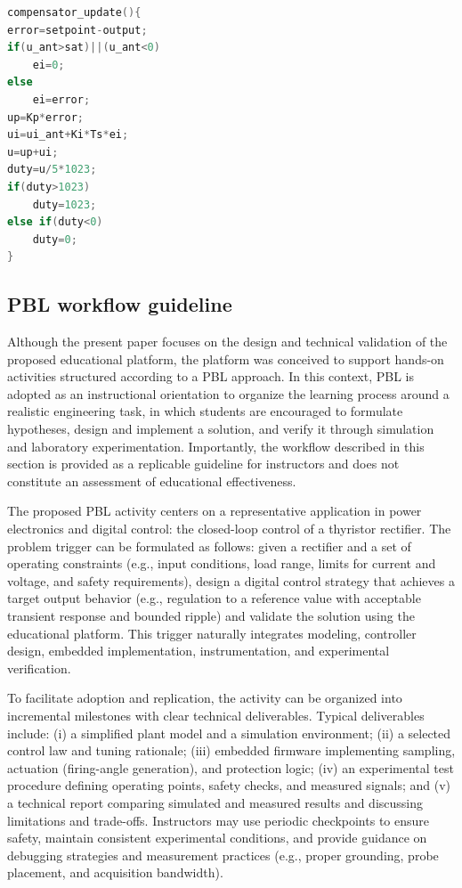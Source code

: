 \documentclass[english]{textolivre}
\begin{document}
\begin{lstlisting}[language=C++, label=lst-code, caption={PI digital control algorithm.}, source={Own authorship.}]
compensator_update(){
error=setpoint-output;
if(u_ant>sat)||(u_ant<0)
    ei=0;
else
    ei=error;
up=Kp*error;
ui=ui_ant+Ki*Ts*ei;
u=up+ui;
duty=u/5*1023;
if(duty>1023)
    duty=1023;
else if(duty<0)
    duty=0;
}
\end{lstlisting} %

\subsection{PBL workflow guideline}
Although the present paper focuses on the design and technical validation of the proposed educational platform, the platform was conceived to support hands-on activities structured according to a PBL approach. In this context, PBL is adopted as an instructional orientation to organize the learning process around a realistic engineering task, in which students are encouraged to formulate hypotheses, design and implement a solution, and verify it through simulation and laboratory experimentation. Importantly, the workflow described in this section is provided as a replicable guideline for instructors and does not constitute an assessment of educational effectiveness.

The proposed PBL activity centers on a representative application in power electronics and digital control: the closed-loop control of a thyristor rectifier. The problem trigger can be formulated as follows: given a rectifier and a set of operating constraints (e.g., input conditions, load range, limits for current and voltage, and safety requirements), design a digital control strategy that achieves a target output behavior (e.g., regulation to a reference value with acceptable transient response and bounded ripple) and validate the solution using the educational platform. This trigger naturally integrates modeling, controller design, embedded implementation, instrumentation, and experimental verification.

To facilitate adoption and replication, the activity can be organized into incremental milestones with clear technical deliverables. Typical deliverables include: (i) a simplified plant model and a simulation environment; (ii) a selected control law and tuning rationale; (iii) embedded firmware implementing sampling, actuation (firing-angle generation), and protection logic; (iv) an experimental test procedure defining operating points, safety checks, and measured signals; and (v) a technical report comparing simulated and measured results and discussing limitations and trade-offs. Instructors may use periodic checkpoints to ensure safety, maintain consistent experimental conditions, and provide guidance on debugging strategies and measurement practices (e.g., proper grounding, probe placement, and acquisition bandwidth).
\end{document}
